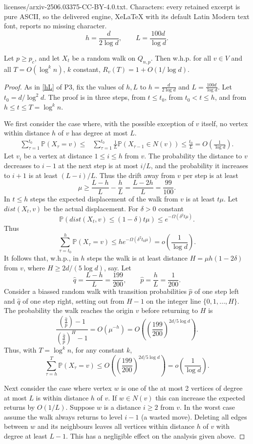 \documentclass[10pt,a4paper]{amsart}
\def\Pr{\mathbb{P}}
\def\d{\delta} \def\D{\Delta}
\def\m{\mu} \def\n{\nu} \def\p{\pi}
\def\t{\tau} \def\om{\omega} \def\OM{\Omega} \def\Om{\Omega}\def\up{\upsilon}\def\U{\Upsilon}
\newcommand{\bfrac}[2]{\left(\frac{#1}{#2}\right)}
\newcommand{\brac}[1]{\left(#1\right)}
\newcommand{\wh}[1]{\widehat{#1}}
\begin{document}
licenses/arxiv-2506.03375-CC-BY-4.0.txt. Characters: every retained excerpt is pure ASCII, so the delivered engine, XeLaTeX with its default Latin Modern text font, reports no missing character.
\begin{equation}\label{hL}
h= \frac{d}{2 \log d}, \qquad L=  \frac {100d}{\log d}.
\end{equation}

\begin{lemma}\label{RT}
Let $p \ge p_c$, and let $X_t$ be a random walk on $Q_{n,p}$. Then w.h.p. for all $v \in V$ and all $T =O(\log^k n)$, $k $ constant, $R_v(T)=1+O(1/\log d)$.
\end{lemma}

\begin{proof}
As in \eqref{hL} of P3, fix the values of $h,L$ to $h= \frac{d}{2 \log d}$ and $ L=  \frac {100d}{\log d}$.
Let $t_0=d/\log^2 d$.
The proof is in three steps, from $t \le  t_0$, from $t_0<t \le h$, and from $h \le t \le T=\log^k n$.

We first consider the case where, with the possible exception of $v$ itself, no vertex within distance $h$ of $v$ has degree at most $L$.
\begin{align*}
\sum_{\t=1}^{t_0} \Pr(X_\t=v) \le& \sum_{\t=1}^{t_0} \frac 1L \Pr(X_{\t-1}\in N(v))
\le \frac{t_0}{L} = O \bfrac 1{\log d}.
\end{align*}
Let $v_i$ be a vertex at distance $1 \le i \le h$ from $v$. The probability the distance to $v$ decreases to $i-1$ at the
next step is at most $i/L$, and the probability it increases to $i+1$ is at least $(L-i)/L$. Thus the drift
away from $v$ per step is at least
\[
\mu \ge \frac{L-h}{L}- \frac hL = \frac{L-2h}{L} = \frac{99}{100}.
\]
In $t \le h$ steps the expected displacement of the walk from $v$ is at least $t\mu$. Let $dist(X_t,v)$ be the
actual displacement. For $\d>0$ constant
\[
\Pr(dist(X_t,v)\le (1-\d)t \mu) \le e^{-\Omega(\d^2 t\m)}.
\]
Thus
\[
\sum_{\t=t_0}^h \Pr(X_\t=v) \le he^{-\Omega(\d^2 t_0\m)} =o\bfrac{1}{\log d}.
\]
It follows  that, w.h.p., in $h$ steps the walk is at least distance $H=\mu h(1-2\d)$ from $v$,
where $H \ge 2 d/(5 \log d)$, say. Let
\[
\wh q= \frac{L-h}{L}= \frac{199}{200}, \qquad \wh p= \frac hL= \frac 1{200}.
\]
Consider a biassed random walk  with transition probabilities $\wh p$ of one step left and $\wh q$ of one step right,
setting out from $H-1$ on the integer line $\{0,1,...,H\}$. The probability the walk reaches the origin $v$ before returning to $H$ is
\[
\frac{ \bfrac{\wh q}{\wh p}-1}{ \bfrac{\wh q}{\wh p}^H-1}=O(\mu^{-h})=O\brac{ \bfrac{199}{200}^{2d/5\log d}}.
\]
Thus, with $T=\log^k n$, for any constant $k$,
\[
\sum_{\t=h}^{T} \Pr(X_\t=v) \le O\brac{ \bfrac{199}{200}^{2d/5\log d}}=o\bfrac{1}{\log d}.
\]

Next consider the case where  vertex $w$ is one of the at most 2 vertices of degree at most $L$ is within distance $h$ of $v$.
If $w \in N(v)$ this can increase the expected returns by $O(1/L)$. Suppose $w$ is a distance $i\ge 2$ from $v$. In the worst case assume the walk always returns to level $i-1$ (a wasted move). Deleting all edges between $w$ and its neighbours leaves all vertices within distance $h$ of $v$ with degree at least $L-1$. This has a negligible effect on the analysis given above.
\end{proof}
\end{document}

